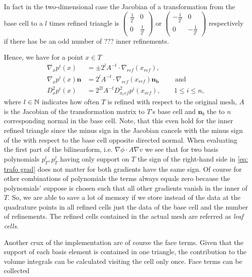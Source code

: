 \begin{example}
In fact in the two-dimensional case the Jacobian of a transformation from the base cell to a $l$ times refined triangle is $
	\begin{pmatrix}
		\frac 1 {2^l} & 0 \\ 0 & \frac 1 {2^l}
	\end{pmatrix} \text{ or }
	\begin{pmatrix}
		-\frac 1 {2^l} & 0 \\ 0 & -\frac 1 {2^l}
	\end{pmatrix}$ respectively if there has be an odd number of ??? inner refinements.

Hence, we have for a point $x \in T$
\begin{align}
\nabla_x p^i(x) &= \pm 2^l A^{-t} \cdot \nabla_{ref}(x_{ref}), \label{eq: trafo grad}\\
\nabla_x p^i(x) \mathbf n &= 2^l A^{-t} \cdot \nabla_{ref}(x_{ref}) \mathbf{ n_{b}} \qquad \text{ and } \\
D_x^2 p^i(x) &= 2^{2l} A^{-t} D_{x_ref}^2 p^i(x_{ref}), \qquad 1 \leq i \leq n,
\end{align}
where $l \in \mathbb{N}$ indicates how often $T$ is refined with respect to the original mesh, $A$ is the Jacobian of the transformation matrix to $T$'s base cell and $\mathbf n_b$ the to $n$ corresponding normal in the base cell. Note, that this even hold for the inner refined triangle since the minus sign in the Jacobian cancels with the minus sign of the with respect to the base cell opposite directed normal.
When evaluating the first part of the bilinearform, i.e. $\nabla \phi \cdot A \nabla v$ we see that for two basis polynomials $p_T^i, p_T^j$ having only support on $T$ the sign of the right-hand side in \eqref{eq: trafo grad} does not matter for both gradients have the same sign. Of course for other combinations of polynomials the terms always equals zero because the polynomials' suppose is chosen such that all other gradients vanish in the inner of $T$.
So, we are able to save a lot of memory if we store instead of the data at the quadrature points in all refined cells just the data of the base cell and the number of refinements. The refined cells contained in the actual mesh are referred as \emph{leaf cells}.
\end{example}

Another crux of the implementation are of course the face terms. 
Given that the support of each basis element is contained in one triangle, the contribution to the volume integrals can be calculated visiting the cell only once.
Face terms can be collected 

